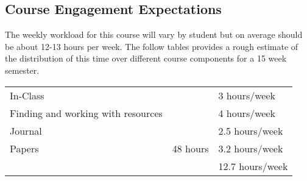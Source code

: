 \documentclass[]{tufte-handout}
\begin{document}
\subsection{Course Engagement Expectations}

The weekly workload for this course will vary by student but on average should be about 12-13 hours per week.  The follow tables provides a rough estimate of the distribution of this time over different course components for a 15 week semester. 
\begin{center}
\begin{tabular}{|l|l|l|}
\hline
In-Class &      & 3 hours/week \\ 
Finding and working with resources &        & 4 hours/week \\
Journal &   & 2.5 hours/week \\ 
Papers & 48 hours & 3.2 hours/week \\
\hline 
& & 12.7 hours/week \\ 
\hline
\end{tabular}
\end{center}

    
\end{document}
